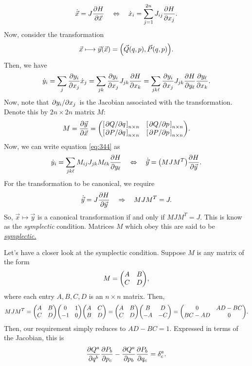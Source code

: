\documentclass{article}
\begin{document}
\begin{equation}
	\dot{\vec{x}} = J \pdv{H}{\vec{x}} \quad \Leftrightarrow \quad \dot{x}_{i} =  \sum_{j=1}^{2n} J_{ij} \pdv{H}{x_{j}}.
\end{equation}
Now, consider the transformation
\begin{equation}
	\vec{x} \longmapsto \vec{y}(\vec{x}) = \qty(\vec{Q}(q,p), \vec{P}(q,p)).
\end{equation}
Then, we have
\begin{equation} \label{eq:344}
	\dot{y}_{i} = \sum_{j} \pdv{y_{i}}{x_{j}} \dot{x}_{j} = \sum_{jk}\pdv{y_{i}}{x_{j}} J_{jk}\pdv{H}{x_{k}} = \sum_{jk\ell} \pdv{y_{i}}{x_{j}} J_{jk} \pdv{H}{y_{\ell}} \pdv{y_{\ell}}{x_{k}}.
\end{equation}
Now, note that $ \pdv*{y_{i}}{x_{j}} $ is the Jacobian associated with the transformation. Denote this by $ 2n \times 2n $ matrix $ M $:
\begin{equation}
	M = \pdv{\vec{y}}{\vec{x}} = \mqty( \qty[\pdv*{Q}{q}]_{n\times n} & \qty[\pdv*{Q}{p}]_{n \times n}  \\
	\qty[\pdv*{P}{q}]_{n\times n} & \qty[\pdv*{P}{p}]_{n \times n}).
\end{equation}
Now, we can write equation \eqref{eq:344} as
\begin{equation}
	\dot{y}_{i} =  \sum_{jk\ell} M_{ij} J_{jk} M_{\ell k} \pdv{H}{y_{\ell}} \quad \Leftrightarrow \quad \dot{\vec{y}} = \qty(M J M^{T}) \pdv{H}{\vec{y}}.
\end{equation}
For the transformation to be canonical, we require
\begin{equation}
	\dot{\vec{y}} = J \pdv{H}{\vec{y}} \quad \Rightarrow \quad M J M^{T} = J.
\end{equation}
So, $ \vec{x} \longmapsto \vec{y} $ is a canonical transformation if and only if $ M J M^{T} = J $. This is know as the \textit{symplectic} condition. Matrices $ M $ which obey this are said to be \href{https://en.wikipedia.org/wiki/Symplectic_matrix}{\textit{symplectic.}}
\par
Let's have a closer look at the symplectic condition. Suppose $ M $ is any matrix of the form
\[
	M = \mqty(A & B \\ C & D), 
\]
where each entry $ A,B,C,D $ is an $ n \times n $ matrix. Then,
\[
	M J M^{T} = \mqty(A & B \\ C & D) \mqty(0 & 1 \\ -1 & 0) \mqty(A & C \\ B & D) = \mqty(A & B \\ C & D) \mqty(B & D \\ -A & -C) = \mqty(0 & AD-BC \\ BC-AD & 0).
\]
Then, our requirement simply reduces to $ AD - BC = 1 $. Expressed in terms of the Jacobian, this is
\begin{equation} \label{eq:348}
	\pdv{Q^{a}}{q^{b}} \pdv{P_{b}}{p_{c}} - \pdv{Q^{a}}{p_{b}} \pdv{P_{b}}{q_{c}} = \delta^{a}_{c}.
\end{equation}
\end{document}
